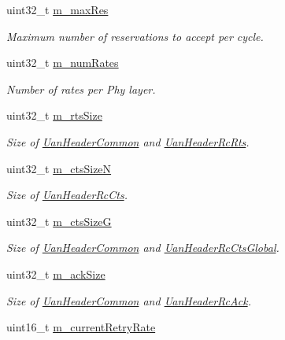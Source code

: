 \begin{DoxyCompactItemize}
uint32\+\_\+t \hyperlink{classns3_1_1UanMacRcGw_a14fb67143992d3c9f81e27f5647045e1}{m\+\_\+max\+Res}
\begin{DoxyCompactList}\small\item\em Maximum number of reservations to accept per cycle. \end{DoxyCompactList}\item 
uint32\+\_\+t \hyperlink{classns3_1_1UanMacRcGw_a86339396f55693d151f8c217bfcf6149}{m\+\_\+num\+Rates}
\begin{DoxyCompactList}\small\item\em Number of rates per Phy layer. \end{DoxyCompactList}\item 
uint32\+\_\+t \hyperlink{classns3_1_1UanMacRcGw_abc2eb00f1a5cbc9cf96fdaf637a20e38}{m\+\_\+rts\+Size}
\begin{DoxyCompactList}\small\item\em Size of \hyperlink{classns3_1_1UanHeaderCommon}{Uan\+Header\+Common} and \hyperlink{classns3_1_1UanHeaderRcRts}{Uan\+Header\+Rc\+Rts}. \end{DoxyCompactList}\item 
uint32\+\_\+t \hyperlink{classns3_1_1UanMacRcGw_a2507eef2cc37e441e72644650341bf70}{m\+\_\+cts\+SizeN}
\begin{DoxyCompactList}\small\item\em Size of \hyperlink{classns3_1_1UanHeaderRcCts}{Uan\+Header\+Rc\+Cts}. \end{DoxyCompactList}\item 
uint32\+\_\+t \hyperlink{classns3_1_1UanMacRcGw_a6600adfdbcfef5bac56caeed02253235}{m\+\_\+cts\+SizeG}
\begin{DoxyCompactList}\small\item\em Size of \hyperlink{classns3_1_1UanHeaderCommon}{Uan\+Header\+Common} and \hyperlink{classns3_1_1UanHeaderRcCtsGlobal}{Uan\+Header\+Rc\+Cts\+Global}. \end{DoxyCompactList}\item 
uint32\+\_\+t \hyperlink{classns3_1_1UanMacRcGw_af6e2ac2d10617fe1807819b71d7ba61b}{m\+\_\+ack\+Size}
\begin{DoxyCompactList}\small\item\em Size of \hyperlink{classns3_1_1UanHeaderCommon}{Uan\+Header\+Common} and \hyperlink{classns3_1_1UanHeaderRcAck}{Uan\+Header\+Rc\+Ack}. \end{DoxyCompactList}\item 
uint16\+\_\+t \hyperlink{classns3_1_1UanMacRcGw_a1fa6713bb1e860c9555ff7a3b7a082c3}{m\+\_\+current\+Retry\+Rate}

\end{DoxyCompactItemize}
